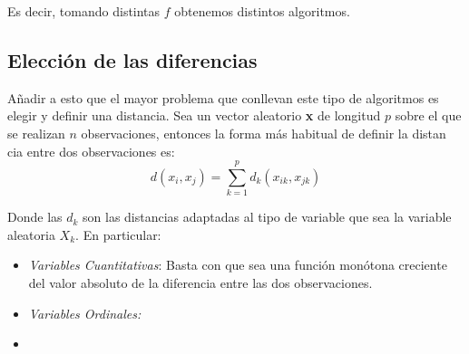 Es decir, tomando distintas $f$ obtenemos distintos algoritmos. 

\newpage
\subsection{Elección de las diferencias }
\noindent Añadir a esto que el mayor problema que conllevan este tipo de algoritmos es elegir y definir una distancia. Sea un vector aleatorio \textbf{x} de longitud $p$ sobre el que se realizan $n$ observaciones, entonces la forma más habitual de definir la distan cia entre dos observaciones es:
\begin{equation}
d(x_i,x_j)=\sum_{k=1}^p d_k(x_{ik},x_{jk})
\end{equation}

\noindent Donde las $d_k$ son las distancias adaptadas al tipo de variable que sea la variable aleatoria $X_k$. En particular:
\begin{itemize}
\item \textit{Variables Cuantitativas}: Basta con que sea una función monótona creciente del valor absoluto de la diferencia entre las dos observaciones. 
\item \textit{Variables Ordinales: }
\item 
\end{itemize}





















